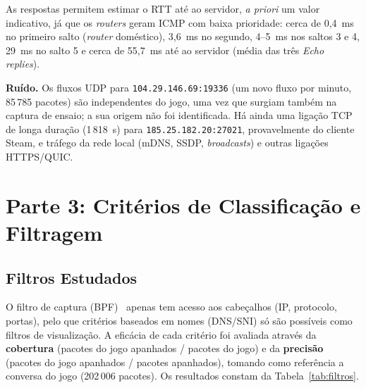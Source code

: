 \documentclass[10.5pt,a4paper]{article}
\newcommand{\ip}[1]{\texttt{#1}}
\begin{document}
As respostas permitem estimar o RTT até ao servidor, \emph{a priori} um valor indicativo, já que
os \emph{routers} geram ICMP com baixa prioridade: cerca de 0,4~ms no primeiro salto (\emph{router}
doméstico), 3,6~ms no segundo, 4--5~ms nos saltos 3 e 4, 29~ms no salto 5 e cerca de 55,7~ms
até ao servidor (média das três \emph{Echo replies}).

\textbf{Ruído.} Os fluxos UDP para \ip{104.29.146.69:19336} (um novo fluxo por minuto, 85\,785
pacotes) são independentes do jogo, uma vez que surgiam também na captura de ensaio; a sua
origem não foi identificada. Há ainda uma ligação TCP de longa duração (1\,818~s) para
\ip{185.25.182.20:27021}, provavelmente do cliente Steam, e tráfego da rede local (mDNS, SSDP,
\emph{broadcasts}) e outras ligações HTTPS/QUIC.

\section{Parte 3: Critérios de Classificação e Filtragem}

\subsection{Filtros Estudados}
O filtro de captura (BPF)~\cite{pcapfilter} apenas tem acesso aos cabeçalhos (IP, protocolo,
portas), pelo que critérios baseados em nomes (DNS/SNI) só são possíveis como filtros de
visualização. A eficácia de cada critério foi avaliada através da \textbf{cobertura} (pacotes do
jogo apanhados / pacotes do jogo) e da \textbf{precisão} (pacotes do jogo apanhados / pacotes
apanhados), tomando como referência a conversa do jogo (202\,006 pacotes). Os resultados constam
da Tabela~\ref{tab:filtros}.
\end{document}

